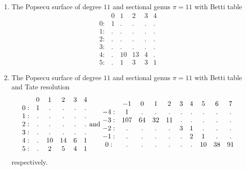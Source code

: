 \documentclass[twoside,12pt, leqno]{amsart}
\begin{document}
\begin{enumerate}
\item   The Popsecu surface of degree $11$ and sectional genus $\pi=11$ with Betti table
$$\begin{matrix}
       & 0 & 1 & 2 & 3 & 4\\
      0: & 1 & . & . & . & .\\
      1: & . & . & . & . & .\\
      2: & . & . & . & . & .\\
      3: & . & . & . & . & .\\
      4: & . & 10 & 13 & 4 & .\\
      5: & . & 1 & 3 & 3 & 1
      \end{matrix}$$

\item   The Popsecu surface of degree $11$ and sectional genus $\pi=11$ with Betti table and Tate resolution
$$\begin{matrix}
       & 0 & 1 & 2 & 3 & 4\\
      0: & 1 & . & . & . & .\\
      1: & . & . & . & . & .\\
      2: & . & . & . & . & .\\
      3: & . & . & . & . & .\\
      4: & . & 10 & 14 & 6 & 1\\
      5: & . & 2 & 5 & 4 & 1
      \end{matrix} \hbox{ and }
      \begin{matrix}
        & -1 & 0 & 1 & 2 & 3 & 4 & 5 & 6 & 7\\
       -4: & 1 & . & . & . & . & . & . & . & .\\
       -3: & 107 & 64 & 32 & 11 & . & . & . & . & .\\
       -2: & . & . & . & . & 3 & 1 & . & . & .\\
       -1: & . & . & . & . & . & 2 & 1 & . & .\\
       0: & . & . & . & . & . & . & 10 & 38 & 91
       \end{matrix}
     $$
     respectively.


\end{enumerate}
\end{document}
